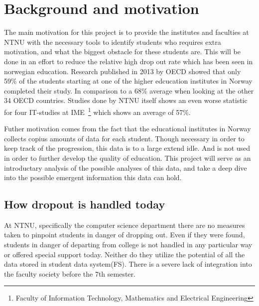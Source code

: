 \section{Background and motivation}
	The main motivation for this project is to provide the institutes and faculties at NTNU 
	with the necessary tools to identify students who requires extra motivation, and what the biggest obstacle for these students are.
	This will be done in an effort to reduce the relative high drop out rate which has been
	seen in norwegian education.
	Research published in 2013 by OECD showed that only 59\% of the students
	starting at one of the higher edcucation institutes in Norway completed their study.
	In comparison to a 68\% average when looking at the other 34 OECD countries\cite{OECD2013}.
	Studies done by NTNU itself shows an even worse statistic for four IT-studies at IME~\footnote{Faculty of Information Technology, Mathematics and Electrical Engineering}
	which shows an average of 57\%\cite{ntnu:dropout}.

	\bigskip\noindent
	Futher motivation comes from the fact that the educational institutes in Norway collects
	copius amounts of data for each student. Though necessary in order to keep track of the progression, 
	this data is to a large extend idle. And is not used in order to further develop the quality of education. 
	This project will serve as an introductary analysis of the possible analyses of this data, 
	and take a deep dive into the possible emergent information this data can hold. 
	
\subsection{How dropout is handled today}
At NTNU, specifically the computer science department there are no measures taken to pinpoint students in danger of dropping out.
Even if they were found, students in danger of departing from college is not handled in any particular way or offered special support today.
Neither do they utilize the potential of all the data stored in student data system(FS).
There is a severe lack of integration into the faculty society before the 7th semester.
